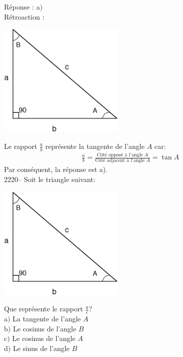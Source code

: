 \documentclass[letterpaper, 12pt]{article}
\begin{document}
R\'eponse : a$)$\\

R\'etroaction :\\
\begin{center}
 \includegraphics[width=6cm,bb=14 14 591 533]{Triangle_rectangle2.eps}
\end{center}
Le rapport $\frac{a}{b}$ repr\'esente la tangente de l'angle $A$ car:
\begin{eqnarray*}
 \frac{a}{b}=\frac{\textrm{C\^ot\'e oppos\'e \`a l'angle $A$}}{\textrm{C\^ot\'e adjacent \`a l'angle $A$}}=\tan{A}
\end{eqnarray*}
Par cons\'equent, la r\'eponse est a).\\

2220-- Soit le triangle suivant: \\
\begin{center}
 \includegraphics[width=6cm,bb=14 14 591 533]{Triangle_rectangle2.eps}
\end{center}
Que repr\'esente le rapport $\frac{a}{c}$?\\

a$)$ La tangente de l'angle $A$\\
b$)$ Le cosinus de l'angle $B$\\
c$)$ Le cosinus de l'angle $A$\\
d$)$ Le sinus de l'angle $B$\\
\end{document}
